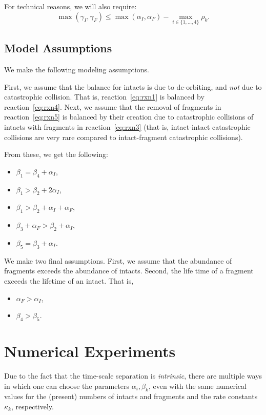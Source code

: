 \documentclass{article}
\begin{document}
For technical reasons, we will also require:
\[\max(\gamma_I, \gamma_F) \leq \max(\alpha_I, \alpha_F) - \max_{i \in \{1, \ldots, 4\}}\rho_k.\]

\subsection{Model Assumptions}
We make the following modeling assumptions.

First, we assume that the balance for intacts is due to de-orbiting, and \emph{not} due to catastrophic collision.
That is, reaction~\eqref{eq:rxn1} is balanced by reaction~\eqref{eq:rxn4}.
Next, we assume that the removal of fragments in reaction~\eqref{eq:rxn5} is balanced by their creation due to catastrophic collisions of intacts with fragments in reaction~\eqref{eq:rxn3} (that is, intact-intact catastrophic collisions are very rare compared to intact-fragment catastrophic collisions).

From these, we get the following:
\begin{itemize}
    \item $\beta_1 = \beta_4 + \alpha_I$,
    \item $\beta_1 > \beta_2 + 2\alpha_I$,
    \item $\beta_1 > \beta_2 + \alpha_I + \alpha_F$,
    \item $\beta_3 + \alpha_F > \beta_2 + \alpha_I$,
    \item $\beta_5 = \beta_3 + \alpha_I$.
\end{itemize}

We make two final assumptions. 
First, we assume that the abundance of fragments exceeds the abundance of intacts.
Second, the life time of a fragment exceeds the lifetime of an intact.
That is,
\begin{itemize}
    \item $\alpha_F > \alpha_I$,
    \item $\beta_4 > \beta_5$.
\end{itemize}


\section{Numerical Experiments}
Due to the fact that the time-scale separation is \emph{intrinsic}, there are multiple ways in which one can choose the parameters $\alpha_i, \beta_k$, even with the same numerical values for the (present) numbers of intacts and fragments and the rate constants $\kappa_k$, respectively.
\end{document}
